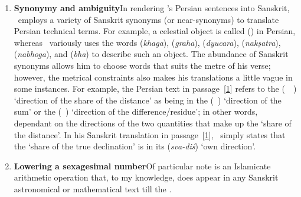 \begin{enumerate}[topsep=0pt]
    \item \textbf{Synonymy and ambiguity}\quad In rendering \MullaFarid's Persian sentences into Sanskrit, \Nityananda\ employs a variety of Sanskrit synonyms (or near-synonyms) to translate Persian technical terms. For example, a celestial object is called  (\kawkab) in Persian, whereas \Nityananda\ variously uses the words   (\textit{khaga}),  (\textit{graha}),   (\textit{dyucara}),  (\textit{nakṣatra}),  (\textit{nabhoga}), and  (\textit{bha}) to describe such an object. The abundance of Sanskrit synonyms allows him to choose words that suits the metre of his verse; however, the metrical constraints also makes his translations a little vague in some instances. For example, the Persian text in passage~[\hyperlink{PEpass1}{1}] refers to the  (\jahat\idafaconsonant\ \hissi\idafavowel\ \bud) `direction of the share of the distance' as being in the   (\jahat\idafaconsonant\ \majmu) `direction of the sum' or the  (\jahat\idafaconsonant\ \fadla) `direction of the difference/residue'; in other words, dependant on the directions of the two quantities that make up the `share of the distance'. In his 
    Sanskrit translation in passage~[\hyperlink{SEpass1}{1}], \Nityananda\ simply states that the `share of the true declination' is in its  (\textit{sva-diś}) `own direction'.
    
    \item \textbf{Lowering a sexagesimal number}\quad Of particular note is an Islamicate arithmetic operation that, to my knowledge, does appear in any Sanskrit astronomical or mathematical text till the \Siddhantasindhu.  
    

\end{enumerate}
